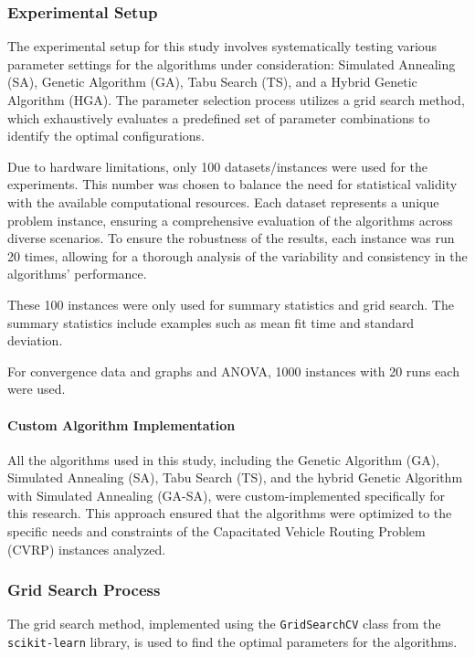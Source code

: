 \documentclass{article}
\begin{document}
    \subsubsection{Experimental Setup}

    The experimental setup for this study involves systematically testing various parameter settings for the algorithms under consideration: Simulated Annealing (SA), Genetic Algorithm (GA), Tabu Search (TS), and a Hybrid Genetic Algorithm (HGA). The parameter selection process utilizes a grid search method, which exhaustively evaluates a predefined set of parameter combinations to identify the optimal configurations.

    Due to hardware limitations, only 100 datasets/instances were used for the experiments. This number was chosen to balance the need for statistical validity with the available computational resources. Each dataset represents a unique problem instance, ensuring a comprehensive evaluation of the algorithms across diverse scenarios. To ensure the robustness of the results, each instance was run 20 times, allowing for a thorough analysis of the variability and consistency in the algorithms’ performance.

    These 100 instances were only used for summary statistics and grid search. The summary statistics include examples such as mean fit time and standard deviation.

    For convergence data and graphs and ANOVA, 1000 instances with 20 runs each were used.

    \paragraph{ Custom Algorithm Implementation}
    All the algorithms used in this study, including the Genetic Algorithm (GA), Simulated Annealing (SA), Tabu Search (TS), and the hybrid Genetic Algorithm with Simulated Annealing (GA-SA), were custom-implemented specifically for this research.
    This approach ensured that the algorithms were optimized to the specific needs and constraints of the Capacitated Vehicle Routing Problem (CVRP) instances analyzed.

    \subsubsection{Grid Search Process}
    The grid search method, implemented using the \texttt{GridSearchCV} class from the \texttt{scikit-learn} library, is used to find the optimal parameters for the algorithms.
\end{document}
